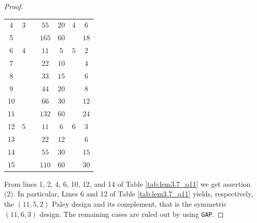 \documentclass[a4paper,twopage,reqno,12pt]{amsart}
\theoremstyle{definition}
\numberwithin{equation}{section}
\newcommand{\A}{\mathrm{A}}
\begin{document}
\begin{proof}
\begin{table}[H]
\begin{tabular}{ccccccc}
        4& $3$ &  & $55$  & $20$ & $4$  & $6$          \\
        5 & & & $165$ & $60$ &   & $18$         \\

        6& $4$ &  & $11$ & $5$ & $5$  & $2$         \\
        7 & & & $22$  & $10$ &   & $4$          \\
        8 & & & $33$  & $15$ &   & $6$          \\
        9 & & & $44$  & $20$ &   & $8$          \\
        10 & & & $66$  & $30$ &   & $12$         \\
        11 & & & $132$ & $60$ &   & $24$         \\

         
        12& $5$ &  & $11$  & $6$  & $6$  & $3$          \\
        13& &  & $22$  & $12$ &   & $6$          \\
        14& &  & $55$  & $30$ &   & $15$         \\
        15& &  & $110$ & $60$ &   & $30$         \\
         \bottomrule
    \end{tabular}    
\end{table}
\normalsize
From lines 1, 2, 4, 6, 10, 12, and 14 of Table \ref{tab:lem3.7_q11} we get assertion (2). In particular, Lines 6 and 12 of Table \ref{tab:lem3.7_q11} yields, respectively, the $(11,5,2)$ Paley design and its complement, that is the symmetric $(11,6,3)$ design. The remaining cases are ruled out by using \texttt{GAP}.
\end{proof}


\end{document}
